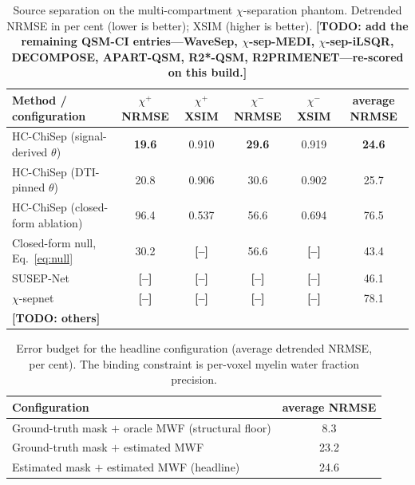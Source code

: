 \documentclass[AMA,STIX2COL,Linenumberson]{MRM}
\newcommand{\TODO}[1]{{\color{red}\textbf{[TODO: #1]}}}
\newcommand{\NUM}[1]{{\color{red}\textbf{[#1]}}}
\newcommand{\TODO}[1]{}
\newcommand{\NUM}[1]{#1}
\begin{document}
\begin{table}[t]
\caption{Source separation on the multi-compartment $\chi$-separation phantom. Detrended NRMSE in per cent (lower is better); XSIM (higher is better). \TODO{add the remaining QSM-CI entries---WaveSep, $\chi$-sep-MEDI, $\chi$-sep-iLSQR, DECOMPOSE, APART-QSM, R2*-QSM, R2PRIMENET---re-scored on this build.}}
\label{tab:main}
\centering
\begin{tabular}{lccccc}
\hline
Method / configuration & $\chi^{+}$ NRMSE & $\chi^{+}$ XSIM & $\chi^{-}$ NRMSE & $\chi^{-}$ XSIM & average NRMSE \\
\hline
HC-ChiSep (signal-derived $\theta$) & \textbf{19.6} & 0.910 & \textbf{29.6} & 0.919 & \textbf{24.6} \\
HC-ChiSep (DTI-pinned $\theta$) & 20.8 & 0.906 & 30.6 & 0.902 & 25.7 \\
HC-ChiSep (closed-form ablation) & 96.4 & 0.537 & 56.6 & 0.694 & 76.5 \\
Closed-form null, Eq.~\eqref{eq:null} & 30.2 & \NUM{--} & 56.6 & \NUM{--} & 43.4 \\
SUSEP-Net & \NUM{--} & \NUM{--} & \NUM{--} & \NUM{--} & 46.1 \\
$\chi$-sepnet & \NUM{--} & \NUM{--} & \NUM{--} & \NUM{--} & 78.1 \\
\TODO{others} & & & & & \\
\hline
\end{tabular}
\end{table}

\begin{table}[t]
\caption{Error budget for the headline configuration (average detrended NRMSE, per cent). The binding constraint is per-voxel myelin water fraction precision.}
\label{tab:budget}
\centering
\begin{tabular}{lc}
\hline
Configuration & average NRMSE \\
\hline
Ground-truth mask $+$ oracle MWF (structural floor) & 8.3 \\
Ground-truth mask $+$ estimated MWF & 23.2 \\
Estimated mask $+$ estimated MWF (headline) & 24.6 \\
\hline
\end{tabular}
\end{table}


\end{document}
